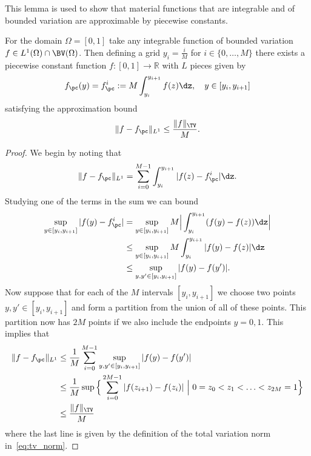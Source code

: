 \documentclass[letterpaper,11pt]{article}
\begin{document}
This lemma is used to show that material functions that are integrable and of bounded variation are approximable by piecewise constants.
\begin{lemma}\label{lem:bv_l1_approx}
    For the domain $\Omega = [0, 1]$  take any integrable function of bounded variation $f \in L^1(\Omega) \cap \BV(\Omega)$. Then defining a grid $y_i = \frac{i}{M}$ for $i \in \{0, \hdots, M\}$ there exists a piecewise constant function $f: [0, 1] \to \mathbb{R}$ with $L$ pieces given by
    \begin{equation}
        f_{\pc}(y) = f_{\pc}^{i} := M\int_{y_i}^{y_{i+1}}f(z)\dz, \quad y \in [y_i, y_{i+1}]
    \end{equation}
    satisfying the approximation bound
    \begin{equation}
        \|f - f_{\pc}\|_{L^1} \leq \frac{\|f\|_{\TV}}{M}.
    \end{equation}
\end{lemma}
\begin{proof}
    We begin by noting that
    \begin{align*}
        \|f - f_{\pc}\|_{L^1} = \sum_{i=0}^{M-1}\int_{y_i}^{y_{i+1}}|f(z) - f_{\pc}^i|\dz.
    \end{align*}
    Studying one of the terms in the sum we can bound
    \begin{align*}
        \sup_{y \in [y_i, y_{i+1}]}|f(y) - f_{\pc}^i| &= \sup_{y \in [y_i, y_{i+1}]}M\Big|\int_{y_i}^{y_{i+1}}(f(y) - f(z))\dz\Big|\\
        &\leq \sup_{y \in [y_i, y_{i+1}]}M\int_{y_i}^{y_{i+1}}|f(y) - f(z)|\dz\\
        &\leq \sup_{y, y' \in [y_i, y_{i+1}]}|f(y) - f(y')|.
    \end{align*}
    Now suppose that for each of the $M$ intervals $[y_i, y_{i+1}]$ we choose two points $y, y' \in [y_i, y_{i+1}]$ and form a partition from the union of all of these points. This partition now has $2M$ points if we also include the endpoints $y = 0, 1$. This implies that
    \begin{align*}
        \|f - f_{\pc}\|_{L^1} &\leq \frac{1}{M}\sum_{i=0}^{M-1}\sup_{y, y' \in [y_i, y_{i+1}]}|f(y) - f(y')|\\
        &\leq \frac{1}{M}\sup\Big\{\sum_{i=0}^{2M-1}|f(z_{i+1}) - f(z_i)| \ \Big| \ 0 = z_0 < z_1 < \hdots < z_{2M} = 1\Big\}\\
        &\leq \frac{\|f\|_{\TV}}{M}
    \end{align*}
    where the last line is given by the definition of the total variation norm in~\eqref{eq:tv_norm}.
\end{proof}
\end{document}
